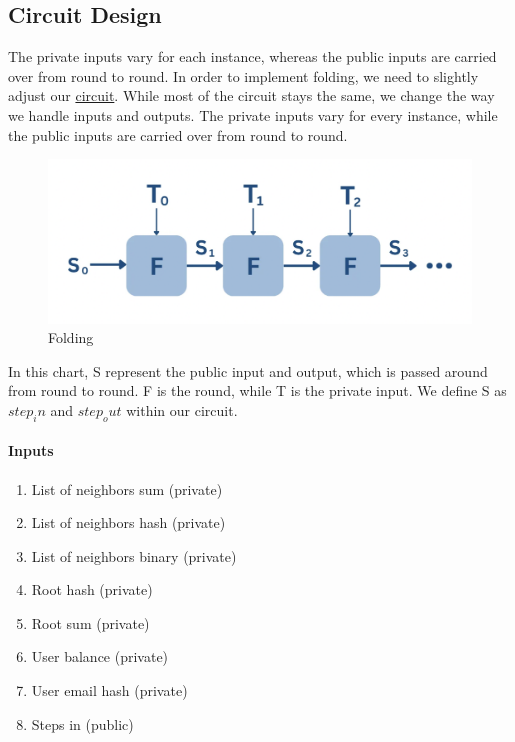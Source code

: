\subsection{Circuit Design}
The private inputs vary for each instance, whereas the public inputs are carried over from round to round.
In order to implement folding, we need to slightly adjust our \hyperref[subsec:pi]{circuit}. While most of the circuit stays the same, we change the way we handle inputs and outputs.
The private inputs vary for every instance, while the public inputs are carried over from round to round.
\begin{figure}[H]
   \centering
   \includegraphics[width=130mm]{FoldingCircuit.png}
   \caption{Folding \cite{VRS23}}
   \label{overflow}
   \end{figure}
In this chart, S represent the public input and output, which is passed around from round to round. F is the round, while T is the private input.
We define S as $step_in$ and $step_out$ within our circuit.


\paragraph{Inputs}
\begin{enumerate}


   \item List of neighbors sum (private)
  
   \item List of neighbors hash (private)


   \item List of neighbors binary (private)


   \item Root hash (private)


   \item Root sum (private)


   \item User balance (private)


   \item User email hash (private)


   \item Steps in (public)
  
   \end{enumerate}


